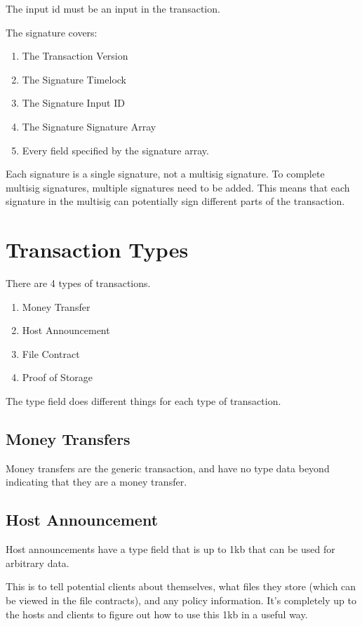 \documentclass[twocolumn]{article}
\begin{document}
The input id must be an input in the transaction.

The signature covers:
\begin{enumerate}
	\item The Transaction Version
	\item The Signature Timelock
	\item The Signature Input ID
	\item The Signature Signature Array
	\item Every field specified by the signature array.
\end{enumerate}

Each signature is a single signature, not a multisig signature.
To complete multisig signatures, multiple signatures need to be added.
This means that each signature in the multisig can potentially sign different parts of the transaction.

\section{Transaction Types}
There are 4 types of transactions.
\begin{enumerate}
	\item Money Transfer
	\item Host Announcement
	\item File Contract
	\item Proof of Storage
\end{enumerate}

The type field does different things for each type of transaction.

\subsection{Money Transfers}
Money transfers are the generic transaction, and have no type data beyond indicating that they are a money transfer.

\subsection{Host Announcement}
Host announcements have a type field that is up to 1kb that can be used for arbitrary data.

This is to tell potential clients about themselves, what files they store (which can be viewed in the file contracts), and any policy information.
It's completely up to the hosts and clients to figure out how to use this 1kb in a useful way.
\end{document}
